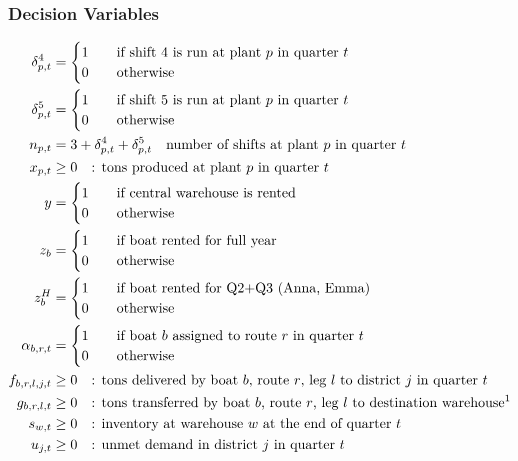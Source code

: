 \documentclass[10pt]{article}
\begin{document}
\subsubsection{Decision Variables}
\begin{align}
    \delta^4_{p, t} &= 
    \begin{cases}
        1 & \quad\text{if shift 4 is run at plant $p$ in quarter $t$} \\
        0 & \quad\text{otherwise}
    \end{cases}\\
    \delta^5_{p, t} &= 
    \begin{cases}
        1 & \quad\text{if shift 5 is run at plant $p$ in quarter $t$} \\
        0 & \quad\text{otherwise}
    \end{cases}\\
    n_{p, t}&= 3 + \delta^4_{p, t} + \delta^5_{p, t}\quad\text{number of shifts at plant $p $ in quarter $t $}\\
    x_{p, t}&\ge 0 \quad\text{: tons produced at plant $p $ in quarter $t $}\\
    y &= 
    \begin{cases}
        1 & \quad\text{if central warehouse is rented} \\
        0 & \quad\text{otherwise}
    \end{cases}\\
    z_b &= 
    \begin{cases}
        1 & \quad\text{if boat rented for full year} \\
        0 & \quad\text{otherwise}
    \end{cases}\\
    z_b^H &= 
    \begin{cases}
        1 & \quad\text{if boat rented for Q2+Q3 (Anna, Emma)} \\
        0 & \quad\text{otherwise}
    \end{cases}\\
    \alpha_{b, r, t} &= 
    \begin{cases}
        1 & \quad\text{if boat $b $ assigned to route $r $ in quarter $ t $} \\
        0 & \quad\text{otherwise}
    \end{cases}\\
    f_{b, r, l, j, t}&\ge 0 \quad\text{: tons delivered by boat $ b $, route $r $, leg $l $ to district $j $ in quarter $t $}\\
    g_{b, r, l, t}&\ge 0 \quad\text{: tons transferred by boat $b $, route $r $, leg $l $ to destination warehouse\footnotemark}\\
    s_{w, t}&\ge 0 \quad\text{: inventory at warehouse $w $ at the end of quarter $t $}\\
    u_{j, t}&\ge 0 \quad\text{: unmet demand in district $j $ in quarter $ t $}
\end{align}
\end{document}
